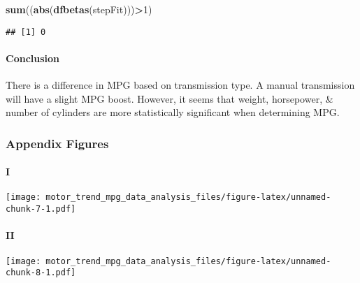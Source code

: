 \documentclass[]{article}
\newenvironment{Shaded}{\begin{snugshade}}{\end{snugshade}}
\newcommand{\DecValTok}[1]{\textcolor[rgb]{0.00,0.00,0.81}{#1}}
\newcommand{\KeywordTok}[1]{\textcolor[rgb]{0.13,0.29,0.53}{\textbf{#1}}}
\newcommand{\NormalTok}[1]{#1}
\newcommand{\OperatorTok}[1]{\textcolor[rgb]{0.81,0.36,0.00}{\textbf{#1}}}
\let\oldparagraph\paragraph
\renewcommand{\paragraph}[1]{\oldparagraph{#1}\mbox{}}
\begin{document}
\begin{Shaded}
\begin{Highlighting}[]
\KeywordTok{sum}\NormalTok{((}\KeywordTok{abs}\NormalTok{(}\KeywordTok{dfbetas}\NormalTok{(stepFit)))}\OperatorTok{>}\DecValTok{1}\NormalTok{)}
\end{Highlighting}
\end{Shaded}

\begin{verbatim}
## [1] 0
\end{verbatim}

\hypertarget{conclusion}{%
\paragraph{Conclusion}\label{conclusion}}

There is a difference in MPG based on transmission type. A manual
transmission will have a slight MPG boost. However, it seems that
weight, horsepower, \& number of cylinders are more statistically
significant when determining MPG.

\hypertarget{appendix-figures}{%
\subsubsection{Appendix Figures}\label{appendix-figures}}

\hypertarget{i}{%
\paragraph{I}\label{i}}

\texttt{[image: motor\_trend\_mpg\_data\_analysis\_files/figure-latex/unnamed-chunk-7-1.pdf]}

\hypertarget{ii}{%
\paragraph{II}\label{ii}}

\texttt{[image: motor\_trend\_mpg\_data\_analysis\_files/figure-latex/unnamed-chunk-8-1.pdf]}
\end{document}
